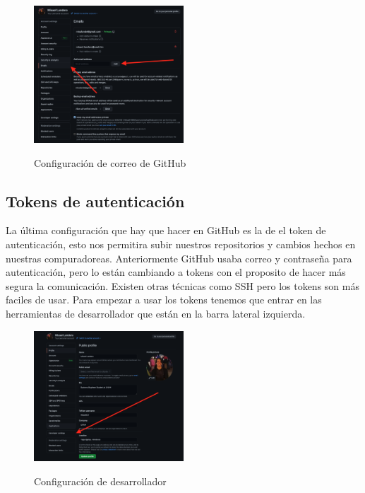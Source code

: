 \documentclass[11pt, oneside]{article}
\begin{document}
\begin{figure}[H]
  \centering
  \caption{Configuración de correo de GitHub}
  \includegraphics[width=0.50\textwidth]{./img/github-settings-3.png}
  \label{fig:github-settings-3}
\end{figure}

\subsection{Tokens de autenticación}

La última configuración que hay que hacer en GitHub es la de el token de autenticación, esto nos permitira subir nuestros repositorios y cambios hechos en nuestras compuradoreas. Anteriormente GitHub usaba correo y contraseña para autenticación, pero lo están cambiando a tokens con el proposito de hacer más segura la comunicación. Existen otras técnicas como SSH pero los tokens son más faciles de usar. Para empezar a usar los tokens tenemos que entrar en las herramientas de desarrollador que están en la barra lateral izquierda.

\begin{figure}[H]
  \centering
  \caption{Configuración de desarrollador}
  \includegraphics[width=0.50\textwidth]{./img/github-tokens-1.png}
  \label{fig:github-tokens-1}
\end{figure}
\end{document}
